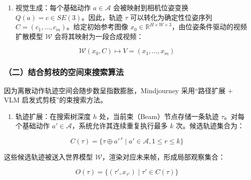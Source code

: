 \begin{enumerate}
\def\labelenumi{\arabic{enumi}.}
\setcounter{enumi}{1}
\tightlist
\item
  视觉生成：每个基础动作 \(a \in \mathcal{A}\) 会被映射到相机位姿变换 \(Q(a) = c \in SE(3)\)。因此，轨迹 \(\tau\) 可以转化为确定性位姿序列 \(C = (c_1, \ldots, c_m)\)。给定初始参考图像 \(x_0 \in \mathbb{R}^{H \times W \times 3}\)，由位姿条件驱动的视频扩散模型 \(\mathcal{W}\) 会将其映射为一段合成视频：
\end{enumerate}

\[
\mathcal{W}(x_0, C) \mapsto V = (x_1, \ldots, x_m)
\]

\hypertarget{ux4e8cux7ed3ux5408ux526aux679dux7684ux7a7aux95f4ux675fux641cux7d22ux7b97ux6cd5}{%
\subsubsection{（二）结合剪枝的空间束搜索算法}\label{ux4e8cux7ed3ux5408ux526aux679dux7684ux7a7aux95f4ux675fux641cux7d22ux7b97ux6cd5}}

因为离散动作轨迹空间会随步数呈指数膨胀，Mindjourney 采用``路径扩展 + VLM 启发式剪枝''的束搜索方法。

\begin{enumerate}
\def\labelenumi{\arabic{enumi}.}
\tightlist
\item
  轨迹扩展：在搜索树深度 \(h\) 处，当前束（Beam）节点存储一条轨迹 \(\tau\)。对每个基础动作 \(a' \in \mathcal{A}\)，系统允许其连续重复执行最多 \(k\) 次。候选轨迹集合为：
\end{enumerate}

\[
C(\tau)
= \{\tau \oplus a'^{\,r} \mid a' \in \mathcal{A}, 1 \le r \le k\}
\]

这些候选轨迹被送入世界模型 \(\mathcal{W}\)，渲染对应未来帧，形成局部观察集合：

\[
O(\tau)
= \{( \tau', x_{\tau'} ) \mid \tau' \in C(\tau)\}
\]

